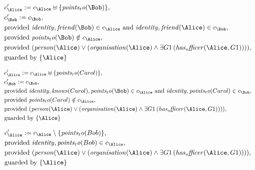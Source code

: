\begin{align*}
&
c'_
{
\Alice
}
 := 
c_
{
\Alice
}
 \uplus 
\{
\mathit{
points_to
}
(
\Bob
)
\}
,\\
&
c'_
{
\Bob
}
 := 
c_
{
\Bob
}
,\\
&
\text{provided } 
\mathit{
identity
}
,
\mathit{
friend
}
(
\Bob
)
 \in c_
{
\Alice
}
 \text{ and } 
\mathit{
identity
}
,
\mathit{
friend
}
(
\Alice
)
 \in c_
{
\Bob
}
,\\
&
\text{provided } 
\mathit{
points_to
}
(
\Bob
)
 \notin c_
{
\Alice
}
,\\
&
\text{provided } 
(
\mathit{
person
}
(
\Alice
)
\lor
(
\mathit{
organisation
}
(
\Alice
)
\land
\exists 
G1
\,(
\mathit{
has_officer
}
(
\Alice
,
G1
)
)
)
)
,\\
&
\text{guarded by } \{
\Alice
\}
\end{align*}

\begin{align*}
&
c'_
{
\Alice
}
 := 
c_
{
\Alice
}
 \uplus 
\{
\mathit{
points_to
}
(
Carol
)
\}
,\\
&
c'_
{
\Bob
}
 := 
c_
{
\Bob
}
,\\
&
\text{provided } 
\mathit{
identity
}
,
\mathit{
knows
}
(
Carol
)
,
\mathit{
points_to
}
(
\Bob
)
 \in c_
{
\Alice
}
 \text{ and } 
\mathit{
identity
}
,
\mathit{
points_to
}
(
Carol
)
 \in c_
{
\Bob
}
,\\
&
\text{provided } 
\mathit{
points_to
}
(
Carol
)
 \notin c_
{
\Alice
}
,\\
&
\text{provided } 
(
\mathit{
person
}
(
\Alice
)
\lor
(
\mathit{
organisation
}
(
\Alice
)
\land
\exists 
G1
\,(
\mathit{
has_officer
}
(
\Alice
,
G1
)
)
)
)
,\\
&
\text{guarded by } \{
\Alice
\}
\end{align*}

\begin{align*}
&
c'_
{
\Alice
}
 := 
c_
{
\Alice
}
 \setminus 
\{
\mathit{
points_to
}
(
Bob
)
\}
,\\
&
\text{provided } 
\mathit{
identity
}
,
\mathit{
points_to
}
(
Bob
)
 \in c_
{
\Alice
}
,\\
&
\text{provided } 
(
\mathit{
person
}
(
\Alice
)
\lor
(
\mathit{
organisation
}
(
\Alice
)
\land
\exists 
G1
\,(
\mathit{
has_officer
}
(
\Alice
,
G1
)
)
)
)
,\\
&
\text{guarded by } \{
\Alice
\}
\end{align*}

